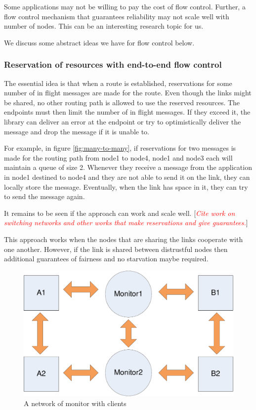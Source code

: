 \documentclass[a4paper,twoside]{report} %
\newcommand{\note}[1]{[\textcolor{red}{\textit{#1}}]}
\begin{document}
Some applications may not be willing to pay the cost of flow control.
Further, a flow control mechanism that guarantees reliability
may not scale well with  number of nodes.
This can be an interesting research topic for us.

We discuss some abstract ideas we have for flow control below.

\subsubsection{Reservation of resources with end-to-end flow control}
The essential idea is that when a route is established,
reservations for some number of in flight messages are made for the route.
Even though the links might be shared,
no other routing path is allowed to use the reserved resources.
The endpoints must then limit the number of in flight messages.
If they exceed it, the library can deliver an error at the endpoint or try to
optimistically deliver the message and drop the message if it is unable to.

For example, in figure \ref{fig:many-to-many},
if reservations for two messages is made for the routing path
from node1 to node4, node1 and node3 each will maintain a queue of size 2.
Whenever they receive a message from the application in node1 destined to node4
and they are not able to send it on the link,
they can locally store the message.
Eventually, when the link has space in it,
they can try to send the message again.

It remains to be seen if the approach can work and scale well.
\note{Cite work on switching networks and other works that make reservations and
  give guarantees.}

This approach works when the nodes that are sharing the links
cooperate with one another.
However, if the link is shared between distrustful
nodes then additional guarantees of fairness and no starvation maybe required.

\begin{figure}[t]
 \includegraphics[width=\columnwidth]{client-monitor.pdf}
 \caption{A network of monitor with clients}\label{fig:client-monitor}
\end{figure}
\end{document}
